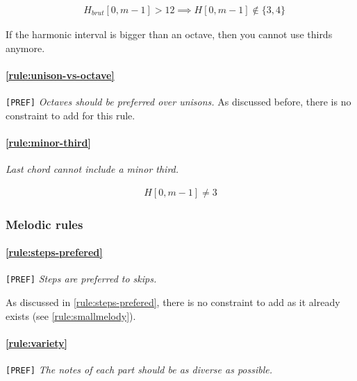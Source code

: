     \begin{equation} \begin{aligned}
    &H_{brut}[0, m-1] > 12 \implies H[0, m-1] \notin \{3, 4\}
    \end{aligned} \end{equation}

    If the harmonic interval is bigger than an octave, then you cannot use thirds anymore.

    \paragraph{\hspace{.6cm}\ref{rule:unison-vs-octave}} \texttt{[PREF]} \textit{Octaves should be preferred over unisons.}
    As discussed before, there is no constraint to add for this rule.

    \paragraph{\hspace{.6cm}\ref{rule:minor-third}}  \textit{Last chord cannot include a minor third.}

    \begin{equation} \begin{aligned}
    H[0, m-1] \neq 3
    \end{aligned} \end{equation}

\subsubsection{Melodic rules}
\paragraph{\hspace{.6cm}\ref{rule:steps-prefered}} \texttt{[PREF]} \textit{Steps are preferred to skips.}

As discussed in \ref{rule:steps-prefered}, there is no constraint to add as it already exists (see \ref{rule:smallmelody}).

\paragraph{\hspace{.6cm}\ref{rule:variety}} \texttt{[PREF]}  \textit{The notes of each part should be as diverse as possible.}

